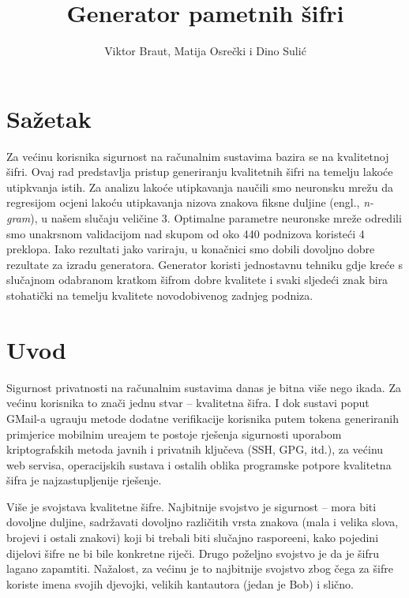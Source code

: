 \documentclass[a4paper,twocolumn,dvipdfm]{article}
\begin{document}
\title{Generator pametnih \v{s}ifri}
\author{Viktor Braut, Matija Osre\v{c}ki i Dino Suli\'c}
\maketitle

\section*{Sa\v{z}etak}

Za ve\'cinu korisnika sigurnost na ra\v{c}unalnim sustavima bazira se na
kvalitetnoj \v{s}ifri. Ovaj rad predstavlja pristup generiranju kvalitetnih
\v{s}ifri na temelju lako\'ce utipkvanja istih. Za analizu lako\'ce utipkavanja
nau\v{c}ili smo neuronsku mre\v{z}u da regresijom ocjeni lako\'cu utipkavanja
nizova znakova fiksne duljine (engl., \emph{n-gram}), u na\v{s}em slu\v{c}aju
veli\v{c}ine 3. Optimalne parametre neuronske mre\v{z}e odredili smo unakrsnom
validacijom nad skupom od oko 440 podnizova koriste\'ci 4 preklopa. Iako
rezultati jako variraju, u kona\v{c}nici smo dobili dovoljno dobre rezultate za
izradu generatora. Generator koristi jednostavnu tehniku gdje kre\'ce s
slu\v{c}ajnom odabranom kratkom \v{s}ifrom dobre kvalitete i svaki sljede\'ci znak bira
stohati\v{c}ki na temelju kvalitete novodobivenog zadnjeg podniza.

\section{Uvod}

Sigurnost privatnosti na ra\v{c}unalnim sustavima danas je bitna vi\v{s}e nego
ikada. Za ve\'cinu korisnika to zna\v{c}i jednu stvar -- kvalitetna \v{s}ifra.
I dok sustavi poput GMail-a ugra\dj uju metode dodatne verifikacije korisnika
putem tokena generiranih primjerice mobilnim ure\dj ajem te postoje
rje\v{s}enja sigurnosti uporabom kriptografskih metoda javnih i privatnih
klju\v{c}eva (SSH, GPG, itd.), za ve\'cinu web servisa, operacijskih sustava i
ostalih oblika programske potpore kvalitetna \v{s}ifra je najzastupljenije
rje\v{s}enje. 

Vi\v{s}e je svojstava kvalitetne \v{s}ifre. Najbitnije svojstvo je sigurnost --
mora biti dovoljne duljine, sadr\v{z}avati dovoljno razli\v{c}itih vrsta
znakova (mala i velika slova, brojevi i ostali znakovi) koji bi trebali biti
slu\v{c}ajno raspore\dj eni, kako pojedini dijelovi \v{s}ifre ne bi bile
konkretne rije\v{c}i. Drugo po\v{z}eljno svojstvo je da je \v{s}ifru lagano
zapamtiti. Na\v{z}alost, za ve\'cinu je to najbitnije svojstvo zbog \v{c}ega za
\v{s}ifre koriste imena svojih djevojki, velikih kantautora (jedan je Bob) i
sli\v{c}no.
\end{document}
